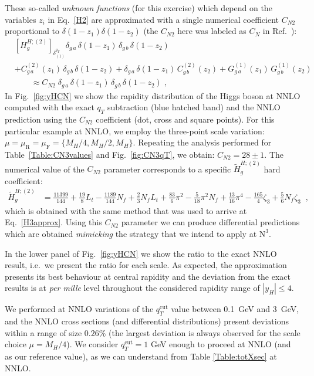 \documentclass[12pt]{article}
\DeclareRobustCommand{\nn}{\nonumber}
\DeclareRobustCommand{\mur}{\ensuremath{\mu_{\mathrm{R}}}\xspace}
\DeclareRobustCommand{\muR}{\mur}
\DeclareRobustCommand{\muf}{\ensuremath{\mu_{\mathrm{F}}}\xspace}
\DeclareRobustCommand{\muF}{\muf}
\DeclareRobustCommand{\qt}{\ensuremath{q_T}\xspace}
\DeclareRobustCommand{\qtcut}{\ensuremath{q_T^\mathrm{cut}}\xspace}
\DeclareRobustCommand{\LO}{\text{LO}\xspace}
\DeclareRobustCommand{\N}[1]{\ensuremath{\text{N}^{#1}}} %
\begin{document}
These so-called \emph{unknown functions} (for this exercise) which depend on the variables $z_i$ in Eq.~\eqref{H2} are approximated with a single numerical coefficient $C_{N2}$ proportional to $\delta(1-z_1)\delta(1-z_2)$ (the $C_{N2}$ here was labeled as $C_{N}$ in Ref.~\cite{Bozzi:2005wk}):
\begin{align}
  &
  \left[ H_g^{H;(2)} \right]_{\delta^{\qt}_{(1)}} 
  \delta_{g\,a} \, \delta(1-z_1) \, \delta_{g\,b} \, \delta(1-z_2) 
  \nn\\&
  + C^{(2)}_{g\,a}(z_1) \, \delta_{g\,b} \, \delta(1-z_2) 
  + \delta_{g\,a} \, \delta(1-z_1) \, C^{(2)}_{g\,b}(z_2) 
  + G^{(1)}_{g\,a}(z_1) \, G^{(1)}_{g\,b}(z_2) 
  \nn\\&\qquad\approx
  C_{N2} \; \delta_{g\,a} \, \delta(1-z_1) \, \delta_{g\,b} \, \delta(1-z_2) \;,
  \label{CNeq}
\end{align}
In Fig.~\ref{fig:yHCN} we show the rapidity distribution of the Higgs boson at NNLO computed with the exact $\qt$ subtraction (blue hatched band) and the NNLO prediction using the $C_{N2}$ coefficient (dot, cross and square points). For this particular example at NNLO, we employ the three-point scale variation: $\mu=\muR=\muF=\{M_{H}/4,M_{H}/2,M_{H}\}$. Repeating the analysis performed for Table~\ref{Table:CN3values} and Fig.~\ref{fig:CN3qT}, we obtain: $C_{N2}=28\pm 1$. The numerical value of the $C_{N2}$ parameter corresponds to a specific $\widetilde{H}^{H;(2)}_{g}$ hard coefficient:
\begin{align}
\label{Ht2g}
\widetilde{H}^{H;(2)}_{g}&=\frac{11399}{144}+\frac{19}{8} L_{t}-\frac{1189}{144} N_{f}+\frac{2}{3} N_{f} L_{t}+\frac{83}{6} \pi^{2} -\frac{5}{18} \pi^{2} N_{f} + \frac{13}{16} \pi^{4} - \frac{165}{4} \zeta_{3} + \frac{5}{6} N_{f} \zeta_{3}\;\;,
\end{align}
which is obtained with the same method that was used to arrive at Eq.~\eqref{H3approx}.
Using this $C_{N2}$ parameter we can produce differential predictions which are obtained \textit{mimicking} the strategy that we intend to apply at \N3\LO. 

In the lower panel of Fig.~\ref{fig:yHCN} we show the ratio to the exact NNLO result, i.e.\ we present the ratio for each scale. As expected, the approximation presents its best behaviour at central rapidity and the deviation from the exact results is at \textit{per mille} level throughout the considered rapidity range of $|y_{H}|\leq 4$.

We performed at NNLO variations of the $\qtcut$ value between 0.1~GeV and 3~GeV, and the NNLO cross sections (and differential distributions) present deviations within a range of size $0.26\%$  (the largest deviation is always observed for the scale choice $\mu=M_{H}/4$).  We consider $\qtcut=1$ GeV enough to proceed at NNLO (and as our reference value), as we can understand from Table \ref{Table:totXsec} at NNLO.
\end{document}
